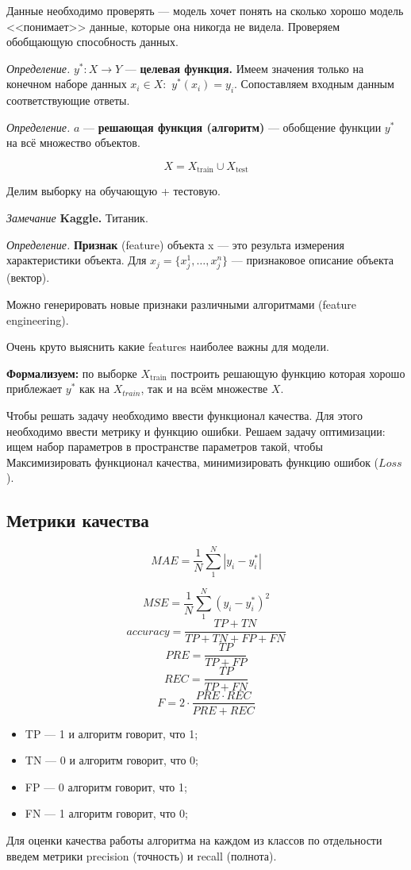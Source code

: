 \documentclass[a4paper,14pt]{article}
\begin{document}
Данные необходимо проверять --- модель хочет понять на сколько хорошо модель <<понимает>> данные, которые она никогда не видела. Проверяем обобщающую способность данных.

{\it Определение.} $y^{*}: X \rightarrow Y$ --- {\bf целевая функция.} Имеем значения только на конечном наборе данных $x_i \in X:$ $y^{*}(x_i) = y_i$. Сопоставляем входным данным соответствующие ответы.

{\it Определение.} $a$ --- {\bf решающая функция (алгоритм)} --- обобщение функции $y^{*}$ на всё множество объектов.

\[
    X = X_{\mathrm{train}} \cup X_{\mathrm{test}}
\]

Делим выборку на обучающую + тестовую.

{\it Замечание} {\bf Kaggle.} Титаник.

{\it Определение.} {\bf Признак } (feature) объекта x --- это результа измерения характеристики объекта. Для $x_j = \{x_j^{1}, \dots, x_j^{n}\}$ --- признаковое описание объекта (вектор).

Можно генерировать новые признаки различными алгоритмами (feature engineering).

Очень круто выяснить какие features наиболее важны для модели.

{\bf Формализуем:} по выборке $X_{\mathrm{train}}$ построить решающую функцию которая хорошо приблежает $y^{*}$ как на $X_{train}$, так и на всём множестве $X$.

Чтобы решать задачу необходимо ввести функционал качества. Для этого необходимо ввести метрику и функцию ошибки. Решаем задачу оптимизации: ищем набор параметров в пространстве параметров такой, чтобы Максимизировать функционал качества, минимизировать функцию ошибок ($Loss$).

\subsection{Метрики качества }
\[
    MAE = \frac{1}{N} \sum\limits_{1}^{N} | y_i - y_i^{*}|
\]

\[ 
    MSE = \frac{1}{N} \sum\limits_{1}^{N}  (y_i - y_i^{*})^2
\]
\[
    accuracy = \frac{TP + TN}{TP + TN + FP + FN}    
\]
\[
    PRE = \frac{TP }{TP + FP}    
\] 
\[
    REC = \frac{TP}{TP + FN}    
\]
\[
    F = 2 \cdot \frac{PRE \cdot REC}{PRE+REC}
\]

\begin{itemize}
    \item TP --- 1 и алгоритм говорит, что 1;
    \item TN --- 0 и алгоритм говорит, что 0;
    \item FP --- 0 алгоритм говорит, что 1;
    \item FN --- 1 алгоритм говорит, что 0;
\end{itemize}
Для оценки качества работы алгоритма на каждом из классов по отдельности введем метрики precision (точность) и recall (полнота).
\end{document}
